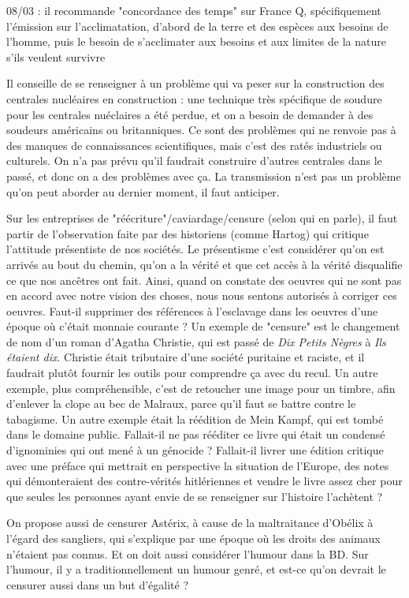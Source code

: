 \documentclass[a4paper,12pt]{book}
\begin{document}
\par 08/03 : il recommande "concordance des temps" sur France Q, spécifiquement l'émission sur l'acclimatation, d'abord de la terre et des espèces aux besoins de l'homme, puis le besoin de s'acclimater aux besoins et aux limites de la nature s'ils veulent survivre
\par Il conseille de se renseigner à un problème qui va peser sur la construction des centrales nucléaires en construction : une technique très spécifique de soudure pour les centrales nuéclaires a été perdue, et on a besoin de demander à des soudeurs américains ou britanniques. Ce sont des problèmes qui ne renvoie pas à des manques de connaissances scientifiques, mais c'est des ratés industriels ou culturels. On n'a pas prévu qu'il faudrait construire d'autres centrales dans le passé, et donc on a des problèmes avec ça. La transmission n'est pas un problème qu'on peut aborder au dernier moment, il faut anticiper.
\par Sur les entreprises de "réécriture"/caviardage/censure (selon qui en parle), il faut partir de l'observation faite par des historiens (comme Hartog) qui critique l'attitude présentiste de nos sociétés. Le présentisme c'est considérer qu'on est arrivés au bout du chemin, qu'on a la vérité et que cet accès à la vérité disqualifie ce que nos ancêtres ont fait. Ainsi, quand on constate des oeuvres qui ne sont pas en accord avec notre vision des choses, nous nous sentons autorisés à corriger ces oeuvres. Faut-il supprimer des références à l'esclavage dans les oeuvres d'une époque où c'était monnaie courante ? Un exemple de "censure" est le changement de nom d'un roman d'Agatha Christie, qui est passé de \textit{Dix Petits Nègres} à \textit{Ils étaient dix}. Christie était tributaire d'une société puritaine et raciste, et il faudrait plutôt fournir les outils pour comprendre ça avec du recul. Un autre exemple, plus compréhensible, c'est de retoucher une image pour un timbre, afin d'enlever la clope au bec de Malraux, parce qu'il faut se battre contre le tabagisme. Un autre exemple était la réédition de Mein Kampf, qui est tombé dans le domaine public. Fallait-il ne pas rééditer ce livre qui était un condensé d'ignominies qui ont mené à un génocide ? Fallait-il livrer une édition critique avec une préface qui mettrait en perspective la situation de l'Europe, des notes qui démonteraient des contre-vérités hitlériennes et vendre le livre assez cher pour que seules les personnes ayant envie de se renseigner sur l'histoire l'achètent ?
\par On propose aussi de censurer Astérix, à cause de la maltraitance d'Obélix à l'égard des sangliers, qui s'explique par une époque où les droits des animaux n'étaient pas connus. Et on doit aussi considérer l'humour dans la BD. Sur l'humour, il y a traditionnellement un humour genré, et est-ce qu'on devrait le censurer aussi dans un but d'égalité ?
\end{document}
